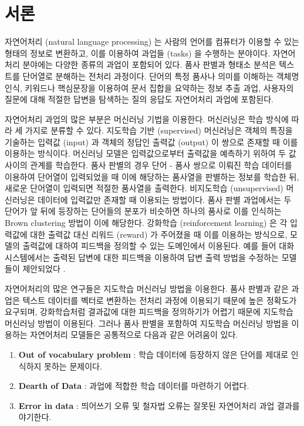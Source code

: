 \documentclass[oneside, ko,phd]{snuthesis_utf8_kor}
\begin{document}

\chapter{서론}\label{introduction}
자연어처리 (natural language processing) 는 사람의 언어를 컴퓨터가 이용할 수 있는 형태의 정보로 변환하고, 이를 이용하여 과업들 (tasks) 을 수행하는 분야이다.
자연어처리 분야에는 다양한 종류의 과업이 포함되어 있다.
품사 판별과 형태소 분석은 텍스트를 단어열로 분해하는 전처리 과정이다.
단어의 특정 품사나 의미를 이해하는 객체명 인식, 키워드나 핵심문장을 이용하여 문서 집합을 요약하는 정보 추출 과업, 사용자의 질문에 대해 적절한 답변을 탐색하는 질의 응답도 자연어처리 과업에 포함된다.

자연어처리 과업의 많은 부분은 머신러닝 기법을 이용한다.
머신러닝은 학습 방식에 따라 세 가지로 분류할 수 있다.
지도학습 기반 (supervised) 머신러닝은 객체의 특징을 기술하는 입력값 (input) 과 객체의 정답인 출력값 (output) 이 쌍으로 존재할 때 이를 이용하는 방식이다.
머신러닝 모델은 입력값으로부터 출력값을 예측하기 위하여 두 값 사이의 관계를 학습한다.
품사 판별의 경우 단어 - 품사 쌍으로 이뤄진 학습 데이터를 이용하여 단어열이 입력되었을 때 이에 해당하는 품사열을 판별하는 정보를 학습한 뒤, 새로운 단어열이 입력되면 적절한 품사열을 출력한다.
비지도학습 (unsupervised) 머신러닝은 데이터에 입력값만 존재할 때 이용되는 방법이다.
품사 판별 과업에서는 두 단어가 앞 뒤에 등장하는 단어들의 분포가 비슷하면 하나의 품사로 이를 인식하는 Brown clustering \cite{brown1992class} 방법이 이에 해당한다.
강화학습 (reinforcement learning) 은 각 입력값에 대한 출력값 대신 리워드 (reward) 가 주어졌을 때 이를 이용하는 방식으로, 모델의 출력값에 대하여 피드백을 정의할 수 있는 도메인에서 이용된다.
예를 들어 대화 시스템에서는 출력된 답변에 대한 피드백을 이용하여 답변 출력 방법을 수정하는 모델들이 제안되었다 \cite{mo2018personalizing, singh2000reinforcement, li2016deep}.

자연어처리의 많은 연구들은 지도학습 머신러닝 방법을 이용한다.
품사 판별과 같은 과업은 텍스트 데이터를 벡터로 변환하는 전처리 과정에 이용되기 때문에 높은 정확도가 요구되며, 강화학습처럼 결과값에 대한 피드백을 정의하기가 어렵기 때문에 지도학습 머신러닝 방법이 이용된다.
그러나 품사 판별을 포함하여 지도학습 머신러닝 방법을 이용하는 자연어처리 모델들은 공통적으로 다음과 같은 어려움이 있다.

\begin{enumerate}
    \item \textbf{Out of vocabulary problem} : 학습 데이터에 등장하지 않은 단어를 제대로 인식하지 못하는 문제이다.
    \item \textbf{Dearth of Data} : 과업에 적합한 학습 데이터를 마련하기 어렵다.
    \item \textbf{Error in data} : 띄어쓰기 오류 및 철자법 오류는 잘못된 자연어처리 과업 결과를 야기한다.
\end{enumerate}
\end{document}
